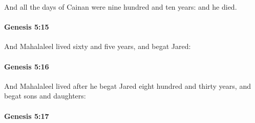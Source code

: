 			And all the days of Cainan were nine hundred and ten years: and he died.


		\paragraph{Genesis 5:15} %
			\label{GENESIS-5-15}

			And Mahalaleel lived sixty and five years, and begat Jared:


		\paragraph{Genesis 5:16} %
			\label{GENESIS-5-16}

			And Mahalaleel lived after he begat Jared eight hundred and thirty years, and begat sons and daughters:


		\paragraph{Genesis 5:17} %
			\label{GENESIS-5-17}

